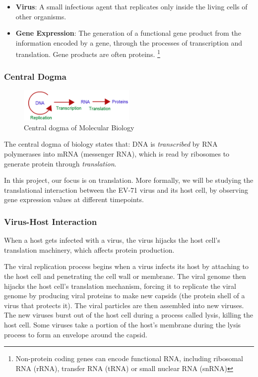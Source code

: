 \begin{itemize}
    \item \textbf{Virus}: A small infectious agent that replicates only inside the living cells of other organisms.
    \item \textbf{Gene Expression}: The generation of a functional gene product from the information encoded by a gene, through the processes of transcription and translation. Gene products are often proteins. \footnote{Non-protein coding genes can encode functional RNA, including ribosomal RNA (rRNA), transfer RNA (tRNA) or small nuclear RNA (snRNA)}
\end{itemize}

\subsubsection{Central Dogma}
\begin{figure}[h]
\centering
\includegraphics[width=0.5\textwidth]{Figures/central-dogma.png}
\caption{Central dogma of Molecular Biology}
\end{figure}

The central dogma of biology states that:
DNA is \textit{transcribed} by RNA polymerases into mRNA (messenger RNA), which is read by ribosomes to generate protein through \textit{translation}. \cite{crick1970central}

In this project, our focus is on translation. More formally, we will be studying the translational interaction between the EV-71 virus and its host cell, by observing gene expression values at different timepoints.

\subsubsection{Virus-Host Interaction}

When a host gets infected with a virus, the virus hijacks the host cell’s translation machinery, which affects protein production.

The viral replication process begins when a virus infects its host by attaching to the host cell and penetrating the cell wall or membrane. The viral genome then hijacks the host cell's translation mechanism, forcing it to replicate the viral genome by producing viral proteins to make new capsids (the protein shell of a virus that protects it). The viral particles are then assembled into new viruses. The new viruses burst out of the host cell during a process called lysis, killing the host cell. Some viruses take a portion of the host's membrane during the lysis process to form an envelope around the capsid. \cite{ScitableVirus}

